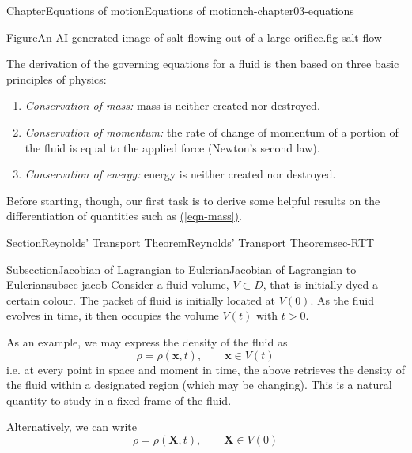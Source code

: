 \documentclass[oneside,10pt,]{book}
\newcommand{\xreffont}{\relax}
\numberwithin{equation}{section}
\newcommand{\bx}{\boldsymbol{x}}
\newcommand{\bX}{\boldsymbol{X}}
\begin{document}
\begin{chapterptx}{Chapter}{Equations of motion}{}{Equations of motion}{}{}{ch-chapter03-equations}
\begin{introduction}{}
\begin{figureptx}{Figure}{An AI-generated image of salt flowing out of a large orifice.}{fig-salt-flow}{}
\begin{image}{0.3}{0.4}{0.3}{}
\end{image}%
\tcblower
\end{figureptx}%
The derivation of the governing equations for a fluid is then based on three basic principles of physics:%
\begin{enumerate}
\item{}\emph{Conservation of mass:} mass is neither created nor destroyed.%
\item{}\emph{Conservation of momentum:} the rate of change of momentum of a portion of the fluid is equal to the applied force (Newton's second law).%
\item{}\emph{Conservation of energy:} energy is neither created nor destroyed.%
\end{enumerate}
%
\par
Before starting, though, our first task is to derive some helpful results on the differentiation of quantities such as \hyperref[eqn-mass]{({\xreffont\ref{eqn-mass}})}.%
\end{introduction}%
%
%
\typeout{************************************************}
\typeout{************************************************}
%
\begin{sectionptx}{Section}{Reynolds' Transport Theorem}{}{Reynolds' Transport Theorem}{}{}{sec-RTT}
%
%
\typeout{************************************************}
\typeout{************************************************}
%
\begin{subsectionptx}{Subsection}{Jacobian of Lagrangian to Eulerian}{}{Jacobian of Lagrangian to Eulerian}{}{}{subsec-jacob}
Consider a fluid volume, \(V \subset D\), that is initially dyed a certain colour. The packet of fluid is initially located at \(V(0)\). As the fluid evolves in time, it then occupies the volume \(V(t)\) with \(t > 0\).%
\par
As an example, we may express the density of the fluid as%
\begin{equation*}
\rho = \rho(\bx, t), \qquad \textrm{$\bx \in V(t)$}
\end{equation*}
i.e. at every point in space and moment in time, the above retrieves the density of the fluid within a designated region (which may be changing). This is a natural quantity to study in a fixed frame of the fluid.%
\par
Alternatively, we can write%
\begin{equation*}
\rho = \rho(\bX, t), \qquad \textrm{$\bX \in V(0)$}

\end{equation*}
\end{subsectionptx}
\end{sectionptx}
\end{chapterptx}
\end{document}
